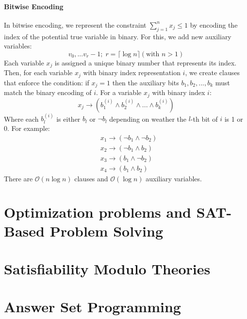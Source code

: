 \documentclass[10pt,a4paper]{report}
\begin{document}
\subsubsection{Bitwise Encoding}
In bitwise encoding, we represent the constraint $\sum_{j=1}^n x_j \leq 1$ by encoding the index of the potential true variable in binary. For this, we add new auxiliary variables:
$$
v_0, ... v_r-1;\; r=\lceil \log n \rceil (\text{with } n > 1)
$$
Each variable $x_j$ is assigned a unique binary number that represents its index. Then, for each variable $x_j$ with binary index representation $i$, we create clauses that enforce the condition: if $x_j = 1$ then the auxiliary bits $b_1, b_2, ..., b_k$ must match the binary encoding of $i$. For a variable $x_j$ with binary index $i$:
$$
x_j \rightarrow (b_1^{(i)} \land b_2^{(i)} \land ... \land b_k^{(i)})
$$
Where each $b_l^{(i)}$ is either $b_l$ or $\neg b_l$ depending on weather the $l$-th bit of $i$ is 1 or 0. For example:
\begin{align*}
&x_1 \rightarrow (\neg b_1 \land \neg b_2)\\
&x_2 \rightarrow (\neg b_1 \land b_2)\\
&x_3 \rightarrow ( b_1 \land \neg b_2)\\
&x_4 \rightarrow (b_1 \land b_2)
\end{align*}
There are $\mathcal{O}(n\log n)$ clauses and $\mathcal{O}(\log n)$ auxiliary variables.
\chapter{Optimization problems and SAT-Based Problem Solving}
\chapter{Satisfiability Modulo Theories}
\chapter{Answer Set Programming}
\end{document}
